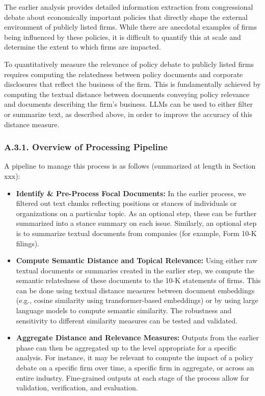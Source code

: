 \documentclass[11pt]{article}
\begin{document}
The earlier analysis provides detailed information extraction from congressional debate about economically important policies that directly shape the external environment of publicly listed firms. While there are anecdotal examples of firms being influenced by these policies, it is difficult to quantify this at scale and determine the extent to which firms are impacted.

To quantitatively measure the relevance of policy debate to publicly listed firms requires computing the relatedness between policy documents and corporate disclosures that reflect the business of the firm. This is fundamentally achieved by computing the textual distance between documents conveying policy relevance and documents describing the firm's business. LLMs can be used to either filter or summarize text, as described above, in order to improve the accuracy of this distance measure.

\subsubsection*{A.3.1. Overview of Processing Pipeline}

A pipeline to manage this process is as follows (summarized at length in Section xxx):

\begin{itemize}
    \item \textbf{Identify \& Pre-Process Focal Documents:} In the earlier process, we filtered out text chunks reflecting positions or stances of individuals or organizations on a particular topic. As an optional step, these can be further summarized into a stance summary on each issue. Similarly, an optional step is to summarize textual documents from companies (for example, Form 10-K filings).
    \item \textbf{Compute Semantic Distance and Topical Relevance:} Using either raw textual documents or summaries created in the earlier step, we compute the semantic relatedness of these documents to the 10-K statements of firms. This can be done using textual distance measures between document embeddings (e.g., cosine similarity using transformer-based embeddings) or by using large language models to compute semantic similarity. The robustness and sensitivity to different similarity measures can be tested and validated.
    \item \textbf{Aggregate Distance and Relevance Measures:} Outputs from the earlier phase can then be aggregated up to the level appropriate for a specific analysis. For instance, it may be relevant to compute the impact of a policy debate on a specific firm over time, a specific firm in aggregate, or across an entire industry. Fine-grained outputs at each stage of the process allow for validation, verification, and evaluation.
\end{itemize}
\end{document}

